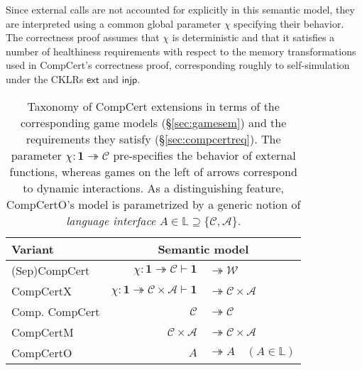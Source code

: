 \documentclass[sigplan,10pt,review]{acmart}
\newcommand{\figsize}{\small}
\newcommand{\kw}[1]{\ensuremath{ \mathsf{#1} }}
\begin{document}
Since external calls are not accounted for explicitly
in this semantic model,
they are interpreted %
using a common global parameter $\chi$
specifying their behavior.
The correctness proof assumes that $\chi$ is deterministic
and that it satisfies a number of healthiness requirements
with respect to the memory transformations
used in CompCert's correctness proof,
corresponding roughly to self-simulation
under the CKLRs $\kw{ext}$ and $\kw{injp}$.


\begin{table} %
  \caption{Taxonomy of CompCert extensions
    in terms of the corresponding game models (\S\ref{sec:gamesem})
    and the requirements they satisfy (\S\ref{sec:compcertreq}).
    The parameter $\chi : \mathbf{1} \twoheadrightarrow \mathcal{C}$
    pre-specifies the behavior of external functions,
    whereas games on the left of arrows
    correspond to dynamic interactions.
    As a distinguishing feature,
    CompCertO's model is parametrized by a generic notion of
    \emph{language interface}
    $A \in \mathbb{L} \supseteq \{\mathcal{C}, \mathcal{A}\}$.
  }
  \label{tbl:compcerts}
  \figsize
  \begin{tabular}{l@{\qquad}r@{}l}
    \hline
    Variant & \multicolumn{2}{c}{Semantic model} \\ %
    \hline
    (Sep)CompCert \cite{compcert,sepcompcert} &
      $\chi : \mathbf{1} \twoheadrightarrow \mathcal{C}
      \vdash \mathbf{1} $ & ${} \twoheadrightarrow \mathcal{W}$ \\
    CompCertX \cite{popl15} &
      \hspace{-1em}
      $\chi : \mathbf{1} \twoheadrightarrow \mathcal{C} \times \mathcal{A}
       \vdash
       \mathbf{1} $ & ${} \twoheadrightarrow \mathcal{C} \times \mathcal{A}$
       \\
    Comp. CompCert \cite{compcompcert} &
      $\mathcal{C}$ & ${} \twoheadrightarrow \mathcal{C}$ \\
    CompCertM \cite{compcertm} &
      $\mathcal{C} \times \mathcal{A} $ & ${}\twoheadrightarrow
       \mathcal{C} \times \mathcal{A}$ \\
    CompCertO &
      $A $ & ${}\twoheadrightarrow A \quad
      (A \in \mathbb{L})$ \\
    \hline
  \end{tabular}
\end{table}
\end{document}
